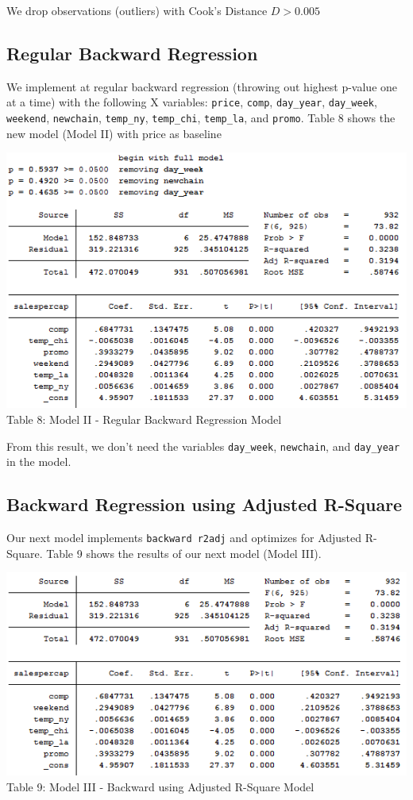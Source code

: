 \documentclass[10pt]{article}
\begin{document}
We drop observations (outliers) with Cook's Distance $D>0.005$

\subsection{Regular Backward Regression}

We implement at regular backward regression (throwing out highest p-value one at a time) with the following X variables: {\tt price}, {\tt comp}, {\tt day\_year}, {\tt day\_week}, {\tt weekend}, {\tt newchain}, {\tt temp\_ny}, {\tt temp\_chi}, {\tt temp\_la}, and {\tt promo}. Table 8 shows the new model (Model II) with price as baseline

\begin{center}
\includegraphics[scale=0.8]{g19.png}\\
Table 8: Model II - Regular Backward Regression Model 
\end{center}

From this result, we don't need the variables {\tt day\_week}, {\tt newchain}, and {\tt day\_year} in the model.

\subsection{Backward Regression using Adjusted R-Square}

Our next model implements {\tt backward r2adj} and optimizes for Adjusted R-Square. Table 9 shows the results of our next model (Model III). 

\begin{center}
\includegraphics[scale=0.8]{g22.png}\\
Table 9: Model III - Backward using Adjusted R-Square Model
\end{center}
\end{document}
